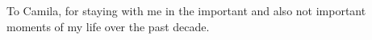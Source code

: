 To Camila, for staying with me in the important and also not important moments of my life over the past decade.